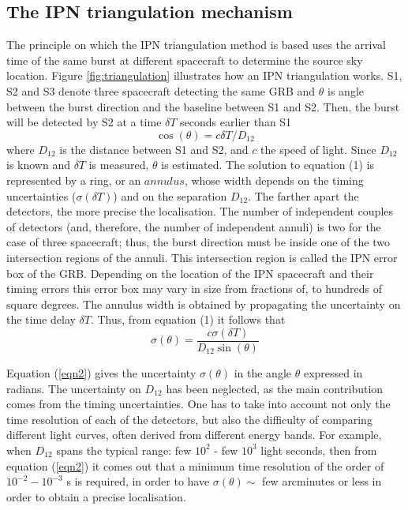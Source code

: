 \documentclass[a4paper]{jpconf}
\begin{document}
\subsection{The IPN triangulation mechanism}
The principle on which the IPN triangulation method is based uses the arrival time of the same burst at different spacecraft to determine the source sky location. Figure \ref{fig:triangulation} illustrates how an IPN triangulation works. S1, S2 and S3 denote three spacecraft detecting the same GRB and $\theta$ is angle between the burst direction and the baseline between S1 and S2.  Then, the burst will be detected by S2 at a time $\delta T$ seconds earlier than S1 
%
\begin{equation}
\cos (\theta) = c \delta T / D_{12}
\label{eqn1}
\end{equation}
%
where $D_{12}$ is the distance between S1 and S2, and $c$ the speed of light. Since $D_{12}$ is known and $\delta T$ is measured, $\theta$ is estimated. The solution to equation (1) is represented by a ring, or an $annulus$, whose width depends on the timing uncertainties ($\sigma(\delta T)$) and on the separation $D_{12}$.  The farther apart the detectors, the more precise the localisation. The number of independent couples of detectors (and, therefore, the number of independent annuli) is two for the case of three spacecraft; thus, the burst direction must be inside one of the two intersection regions of the annuli. This intersection region is called the IPN error box of the GRB. Depending on the location of the IPN spacecraft and their timing errors this error box may vary in size from fractions of, to hundreds of square degrees. The annulus width is obtained by propagating the uncertainty on the time delay $\delta T$. Thus, from equation (1) it follows that
%
\begin{equation}
\sigma(\theta) = \frac{c\sigma (\delta T)}{D_{12} \sin (\theta)}
\label{eqn2}
\end{equation}

Equation (\ref{eqn2}) gives the uncertainty $\sigma(\theta)$ in the angle $\theta$ expressed in radians.  The uncertainty on $D_{12}$ has been neglected, as the main contribution comes from the timing uncertainties. One has to take into account not only the time resolution of each of the detectors, but also the difficulty of comparing different light curves, often derived from different energy bands. For example, when $D_{12}$ spans the typical range: few $10^2$ - few $10^3$ light seconds, then from equation (\ref{eqn2}) it comes out that a minimum time resolution of the order of $10^{-2} - 10^{-3}$ s is required, in order to have $\sigma(\theta) \sim$ few arcminutes or less in order to obtain a precise localisation.
\end{document}
